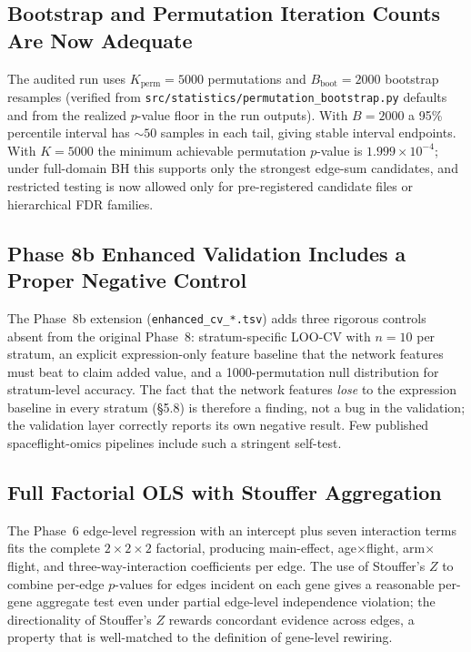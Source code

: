 \documentclass[11pt]{article}
\newcommand{\code}[1]{\texttt{#1}}
\begin{document}
\subsection{Bootstrap and Permutation Iteration Counts Are Now Adequate}
The audited run uses $K_{\text{perm}}{=}5000$ permutations and $B_{\text{boot}}{=}2000$ bootstrap resamples (verified from \code{src/statistics/permutation\_bootstrap.py} defaults and from the realized $p$-value floor in the run outputs). With $B{=}2000$ a 95\% percentile interval has $\sim 50$ samples in each tail, giving stable interval endpoints. With $K{=}5000$ the minimum achievable permutation $p$-value is $1.999\times 10^{-4}$; under full-domain BH this supports only the strongest edge-sum candidates, and restricted testing is now allowed only for pre-registered candidate files or hierarchical FDR families.

\subsection{Phase 8b Enhanced Validation Includes a Proper Negative Control}
The Phase~8b extension (\code{enhanced\_cv\_*.tsv}) adds three rigorous controls absent from the original Phase~8: stratum-specific LOO-CV with $n{=}10$ per stratum, an explicit expression-only feature baseline that the network features must beat to claim added value, and a 1000-permutation null distribution for stratum-level accuracy. The fact that the network features \emph{lose} to the expression baseline in every stratum (\S 5.8) is therefore a finding, not a bug in the validation; the validation layer correctly reports its own negative result. Few published spaceflight-omics pipelines include such a stringent self-test.

\subsection{Full Factorial OLS with Stouffer Aggregation}
The Phase~6 edge-level regression with an intercept plus seven interaction terms fits the complete $2{\times}2{\times}2$ factorial, producing main-effect, age$\times$flight, arm$\times$flight, and three-way-interaction coefficients per edge. The use of Stouffer's $Z$ to combine per-edge $p$-values for edges incident on each gene gives a reasonable per-gene aggregate test even under partial edge-level independence violation; the directionality of Stouffer's $Z$ rewards concordant evidence across edges, a property that is well-matched to the definition of gene-level rewiring.
\end{document}
